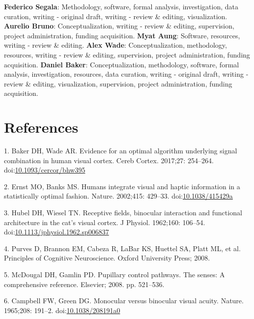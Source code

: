 \documentclass[
]{article}
\begin{document}
\textbf{Federico Segala}: Methodology, software, formal analysis, investigation, data curation, writing - original draft, writing - review \& editing, visualization. \textbf{Aurelio Bruno}: Conceptualization, writing - review \& editing, supervision, project administration, funding acquisition. \textbf{Myat Aung}: Software, resources, writing - review \& editing. \textbf{Alex Wade}: Conceptualization, methodology, resources, writing - review \& editing, supervision, project administration, funding acquisition. \textbf{Daniel Baker}: Conceptualization, methodology, software, formal analysis, investigation, resources, data curation, writing - original draft, writing - review \& editing, visualization, supervision, project administration, funding acquisition.

\hypertarget{references}{%
\section*{References}\label{references}}

\hypertarget{refs}{}
\leavevmode\hypertarget{ref-Baker2017}{}%
1. Baker DH, Wade AR. Evidence for an optimal algorithm underlying signal combination in human visual cortex. Cereb Cortex. 2017;27: 254--264. doi:\href{https://doi.org/10.1093/cercor/bhw395}{10.1093/cercor/bhw395}

\leavevmode\hypertarget{ref-Ernst2002}{}%
2. Ernst MO, Banks MS. Humans integrate visual and haptic information in a statistically optimal fashion. Nature. 2002;415: 429--33. doi:\href{https://doi.org/10.1038/415429a}{10.1038/415429a}

\leavevmode\hypertarget{ref-Hubel1962}{}%
3. Hubel DH, Wiesel TN. Receptive fields, binocular interaction and functional architecture in the cat's visual cortex. J Physiol. 1962;160: 106--54. doi:\href{https://doi.org/10.1113/jphysiol.1962.sp006837}{10.1113/jphysiol.1962.sp006837}

\leavevmode\hypertarget{ref-Purves2008}{}%
4. Purves D, Brannon EM, Cabeza R, LaBar KS, Huettel SA, Platt ML, et al. Principles of Cognitive Neuroscience. Oxford University Press; 2008.

\leavevmode\hypertarget{ref-McDougal2008}{}%
5. McDougal DH, Gamlin PD. Pupillary control pathways. The senses: A comprehensive reference. Elsevier; 2008. pp. 521--536.

\leavevmode\hypertarget{ref-Campbell1965}{}%
6. Campbell FW, Green DG. Monocular versus binocular visual acuity. Nature. 1965;208: 191--2. doi:\href{https://doi.org/10.1038/208191a0}{10.1038/208191a0}
\end{document}
